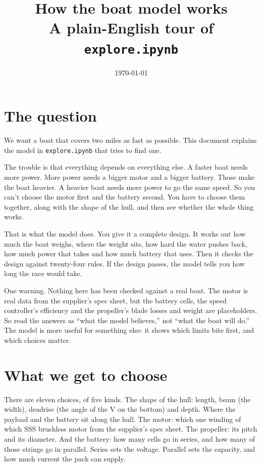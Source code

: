 \documentclass[11pt,a4paper]{article}
\title{How the boat model works\\[0.4em]
\large A plain-English tour of \texttt{explore.ipynb}}
\author{}
\date{\today}
\renewcommand{\_}{\textunderscore\allowbreak}
\newcommand{\code}[1]{\texttt{#1}}
\begin{document}
\maketitle
\thispagestyle{fancy}

\section*{The question}

We want a boat that covers two miles as fast as possible. This document explains the model in \code{explore.ipynb} that tries to find one.

The trouble is that everything depends on everything else. A faster boat needs more power. More power needs a bigger motor and a bigger battery.
Those make the boat heavier. A heavier boat needs more power to go the same speed. So you can't choose the motor first and the battery second.
You have to choose them together, along with the shape of the hull, and then see whether the whole thing works.

That is what the model does. You give it a complete design. It works out how much the boat weighs, where the weight sits, how hard the water pushes back,
how much power that takes and how much battery that uses. Then it checks the design against twenty-four rules. If the design passes, the model tells you how long the race would take.

One warning. Nothing here has been checked against a real boat. The motor is real data from the supplier's spec sheet, but the battery cells, the speed controller's efficiency and the propeller's blade losses and weight are placeholders.
So read the answers as ``what the model believes,'' not ``what the boat will do.'' The model is more useful for something else: it shows which limits bite first,
and which choices matter.

\section*{What we get to choose}

There are eleven choices, of five kinds. The shape of the hull: length, beam (the width), deadrise (the angle of the V on the bottom) and depth.
Where the payload and the battery sit along the hull. The motor: which one winding of which SSS brushless motor from the supplier's spec sheet. The propeller: its pitch and its diameter. And the battery: how many cells go in series, and how many of
those strings go in parallel. Series sets the voltage. Parallel sets the capacity, and how much current the pack can supply.
\end{document}
